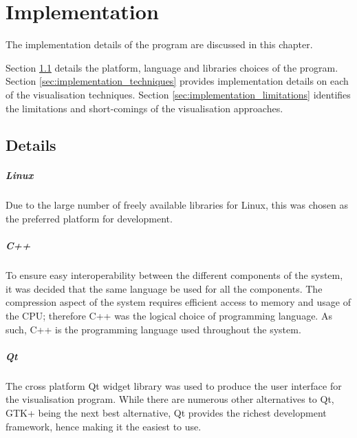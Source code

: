 \graphicspath{{./implementation/}}

\chapter{Implementation}
\label{cha:implementation}

The implementation details of the program are discussed in this chapter.

Section \ref{sec:implementation_details} details the platform, language and
libraries choices of the program. Section \ref{sec:implementation_techniques}
provides implementation details on each of the visualisation techniques.
Section \ref{sec:implementation_limitations} identifies the limitations and
short-comings of the visualisation approaches.

\section{Details}
\label{sec:implementation_details}

\paragraph{Linux}

Due to the large number of freely available libraries for Linux, this was
chosen as the preferred platform for development.


\paragraph{C++}

To ensure easy interoperability between the different components of the system,
it was decided that the same language be used for all the components. The
compression aspect of the system requires efficient access to memory and usage
of the CPU; therefore C++ was the logical choice of programming language. As
such, C++ is the programming language used throughout the system.


\paragraph{Qt}

The cross platform Qt widget library \citep{Qt} was used to produce the user
interface for the visualisation program. While there are numerous other
alternatives to Qt, GTK+ being the next best alternative, Qt provides the
richest development framework, hence making it the easiest to use.

